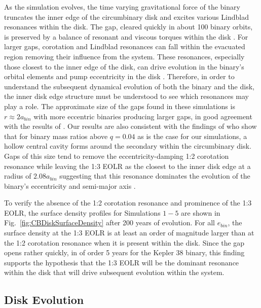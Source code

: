 As the simulation evolves, the time varying gravitational force of the
binary truncates the inner edge of the circumbinary disk and excites
various Lindblad resonances within the disk.  The gap, cleared quickly
in about 100 binary orbits, is preserved by a balance of resonant and
viscous torques within the disk \citep{Artymowicz1994}.  For larger gaps,
corotation and Lindblad resonances can fall within the evacuated
region removing their influence from the system.  These resonances,
especially those closest to the inner edge of the disk, can drive
evolution in the binary's orbital elements \citep{Goldreich1980,Artymowicz1991} and
pump eccentricity in the disk \citep{Papaloizou2001}.  Therefore, in
order to understand the subsequent dynamical evolution of both the
binary and the disk, the inner disk edge structure must be understood to see which
resonances may play a role.  The approximate size of the gaps found in
these simulations is $r \approx 2 a_{bin}$ with more eccentric binaries
producing larger gaps, in good agreement with the results of
\citet{Artymowicz1994}.  Our results are also consistent with the findings of \citet{DOrazio2016} who show that for binary mass ratios above $q = 0.04$ as is the case 
for our simulations, a hollow central cavity forms around the secondary within the circumbinary disk.  Gaps of this size tend to remove the eccentricity-damping 
1:2 corotation resonance while leaving the 1:3 EOLR as the closest to the inner disk edge at a radius of $2.08 a_{bin}$ suggesting that this resonance 
dominates the evolution of the binary's eccentricity and semi-major axis \citep{Artymowicz1991,Artymowicz1992,Papaloizou2001}.

To verify the absence of the 1:2 corotation resonance and prominence
of the 1:3 EOLR, the surface density profiles for Simulations $1-5$
are shown in Fig.~\ref{fig:CBDiskSurfaceDensity} after 200 years of evolution.
For all $e_{bin}$, the surface density at the 1:3 EOLR is at least an
order of magnitude larger than at the 1:2 corotation resonance when it
is present within the disk.  Since the gap opens rather quickly, in of order 5 years for the Kepler 38 binary,  this finding supports the hypothesis that the 1:3 EOLR will be the dominant resonance within the disk that will drive subsequent evolution within the system.


\subsection{Disk Evolution}

